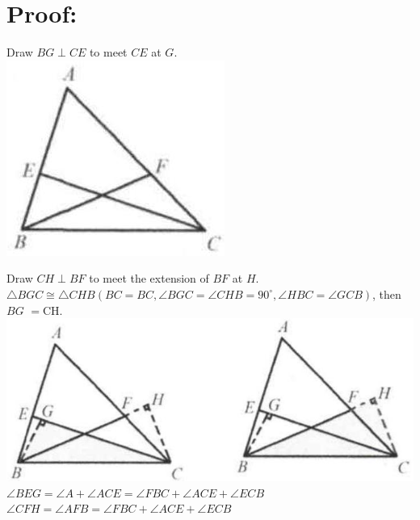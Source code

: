 \documentclass[10pt]{article}
\begin{document}
\section*{Proof:}
Draw \(B G \perp C E\) to meet \(C E\) at \(G\).\\
\includegraphics[max width=\textwidth, center]{2025_04_17_97bc1f7e44d93c271a88g-085(2)}

Draw \(C H \perp B F\) to meet the extension of \(B F\) at \(H\).\\
\(\triangle B G C \cong \triangle C H B\left(B C=B C, \angle B G C=\angle C H B=90^{\circ}, \angle H B C=\angle G C B\right)\), then \(B G\) \(=\mathrm{CH}\).\\
\includegraphics[max width=\textwidth, center]{2025_04_17_97bc1f7e44d93c271a88g-085(1)}\\
\(\angle B E G=\angle A+\angle A C E=\angle F B C+\angle A C E+\angle E C B\)\\
\(\angle C F H=\angle A F B=\angle F B C+\angle A C E+\angle E C B\)
\end{document}
